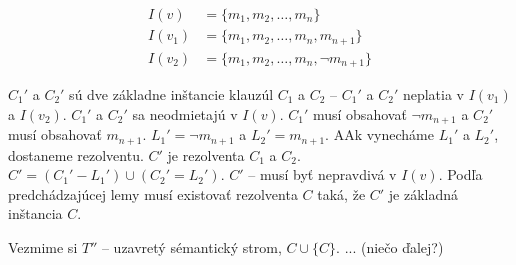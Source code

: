 \begin{dokaz}
\begin{itemize}
        \begin{align*}
            I(v)    &= \{ m_1, m_2, \ldots, m_n \} \\
            I(v_1)  &= \{ m_1, m_2, \ldots, m_n, m_{n+1} \}  \\
            I(v_2)  &= \{ m_1, m_2, \ldots, m_n, \neg m_{n+1} \} 
        \end{align*}

        $C_1'$ a $C_2'$ sú dve základne inštancie klauzúl $C_1$ a $C_2$ -- $C_1'$ a
        $C_2'$ neplatia v $I(v_1)$ a $I(v_2)$. $C_1'$ a $C_2'$ sa neodmietajú v $I(v)$.
        $C_1'$ musí obsahovať $\neg m_{n+1}$ a $C_2'$ musí obsahovať $m_{n+1}$. $L_1' =
        \neg m_{n+1}$ a $L_2' = m_{n+1}$. AAk vynecháme $L_1'$ a $L_2'$, dostaneme
        rezolventu. $C'$ je rezolventa $C_1$ a $C_2$. $C' = (C_1' - L_1') \cup (C_2' =
        L_2')$. $C'$ -- musí byť nepravdivá v $I(v)$. Podľa predchádzajúcej lemy musí
        existovať rezolventa $C$ taká, že $C'$ je základná inštancia $C$.

        \par Vezmime si $T''$ -- uzavretý sémantický strom, $C \cup \{C\}$. ... (niečo
        ďalej?)
    \end{itemize}
\end{dokaz}

